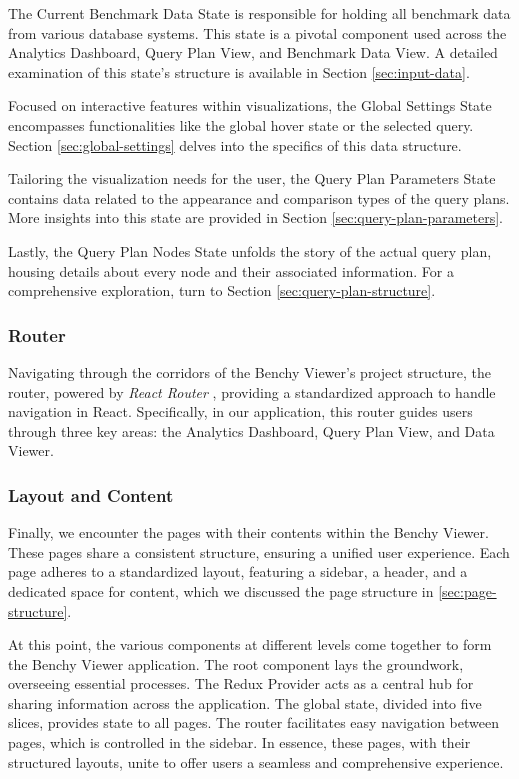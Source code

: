 The Current Benchmark Data State is responsible for holding all benchmark data from various database systems. This state is a pivotal component used across the Analytics Dashboard, Query Plan View, and Benchmark Data View. A detailed examination of this state's structure is available in Section \ref{sec:input-data}.

Focused on interactive features within visualizations, the Global Settings State encompasses functionalities like the global hover state or the selected query. Section \ref{sec:global-settings} delves into the specifics of this data structure.

Tailoring the visualization needs for the user, the Query Plan Parameters State contains data related to the appearance and comparison types of the query plans. More insights into this state are provided in Section \ref{sec:query-plan-parameters}.

Lastly, the Query Plan Nodes State unfolds the story of the actual query plan, housing details about every node and their associated information. For a comprehensive exploration, turn to Section \ref{sec:query-plan-structure}.


\subsubsection{Router}
Navigating through the corridors of the Benchy Viewer's project structure, the router, powered by \textit{React Router} \parencite{react-router}, providing a standardized approach to handle navigation in React. Specifically, in our application, this router guides users through three key areas: the Analytics Dashboard, Query Plan View, and Data Viewer.

\subsubsection{Layout and Content}
Finally, we encounter the pages with their contents within the Benchy Viewer. These pages share a consistent structure, ensuring a unified user experience. Each page adheres to a standardized layout, featuring a sidebar, a header, and a dedicated space for content, which we discussed the page structure in \ref{sec:page-structure}.

At this point, the various components at different levels come together to form the Benchy Viewer application. The root component lays the groundwork, overseeing essential processes. The Redux Provider acts as a central hub for sharing information across the application. The global state, divided into five slices, provides state to all pages. The router facilitates easy navigation between pages, which is controlled in the sidebar. In essence, these pages, with their structured layouts, unite to offer users a seamless and comprehensive experience.














